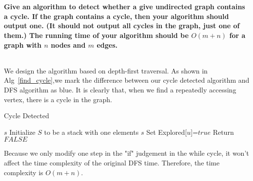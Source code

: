 
\chapter{}
\textbf{
Give an algorithm to detect whether a give undirected graph contains a cycle. If the graph contains a cycle, then your algorithm should output one. (It should not output all cycles in the graph, just one of them.) The running time of your algorithm should be $O(m+n)$ for a graph with $n$ nodes and $m$ edges.
}


\hspace*{\fill} \\

We design the algorithm based on depth-first traversal. As shown in Alg~\ref{find_cycle},we mark the difference between our cycle detected algorithm and DFS algorithm as blue. It is clearly that, when we find a repeatedly accessing vertex, there is a cycle in the graph.
\begin{algorithm}
\caption{Cycle Detected}
\label{find_cycle}
\begin{algorithmic}[1]
\REQUIRE $s$
\STATE Initialize $S$ to be a stack with one elements $s$
        \STATE Set Explored[$u$]=$true$
        \ENDFOR
    \ELSE
    \ENDIF
\ENDWHILE
\STATE Return $FALSE$

\end{algorithmic}
\end{algorithm}

Because we only modify one step in the "if" judgement in the while cycle, it won't affect the time complexity of the original DFS time. Therefore, the time complexity is $O(m+n)$.